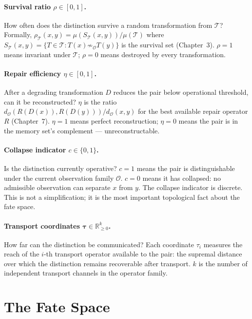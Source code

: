 \documentclass[12pt,twoside,openright]{book}
\newcommand{\transfam}{\mathcal{T}}       %
\newcommand{\obs}{\mathcal{O}}
\newcommand{\survRatio}{\rho}             %
\newcommand{\repEff}{\eta}               %
\newcommand{\collapseInd}{c}             %
\begin{document}
\paragraph{Survival ratio $\survRatio\in[0,1]$.}
How often does the distinction survive a random transformation
from $\transfam$? Formally, $\survRatio_\transfam(x,y)=
\mu(S_\transfam(x,y))/\mu(\transfam)$ where
$S_\transfam(x,y)=\{T\in\transfam:T(x)\not\sim_\obs T(y)\}$
is the survival set (Chapter~3). $\survRatio=1$ means invariant
under $\transfam$; $\survRatio=0$ means destroyed by every
transformation.

\paragraph{Repair efficiency $\repEff\in[0,1]$.}
After a degrading transformation $D$ reduces the pair below
operational threshold, can it be reconstructed? $\repEff$ is
the ratio $d_\obs(R(D(x)),R(D(y)))/d_\obs(x,y)$ for the best
available repair operator $R$ (Chapter~7). $\repEff=1$ means
perfect reconstruction; $\repEff=0$ means the pair is in the
memory set's complement --- unreconstructable.

\paragraph{Collapse indicator $\collapseInd\in\{0,1\}$.}
Is the distinction currently operative? $\collapseInd=1$ means
the pair is distinguishable under the current observation
family $\obs$. $\collapseInd=0$ means it has collapsed: no
admissible observation can separate $x$ from $y$. The collapse
indicator is discrete. This is not a simplification; it is the
most important topological fact about the fate space.

\paragraph{Transport coordinates $\boldsymbol{\tau}
\in\mathbb{R}_{\ge0}^k$.}
How far can the distinction be communicated? Each coordinate
$\tau_i$ measures the reach of the $i$-th transport operator
available to the pair: the supremal distance over which the
distinction remains recoverable after transport. $k$ is the
number of independent transport channels in the operator family.

\section{The Fate Space}
\end{document}
